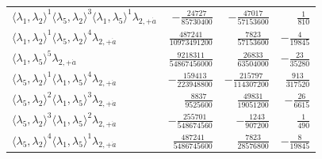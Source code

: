 \begin{longtable}{@{}lrrr@{}}
$\langle\lambda_1,\lambda_2\rangle^{1}\langle\lambda_5,\lambda_2\rangle^{3}\langle\lambda_1,\lambda_5\rangle^{1}\lambda_{2,+\dot a}$ & $-\frac{24727}{85730400}$ & $-\frac{47017}{57153600}$ & $\frac{1}{810}$ \\
$\langle\lambda_1,\lambda_2\rangle^{1}\langle\lambda_5,\lambda_2\rangle^{4}\lambda_{2,+\dot a}$ & $\frac{487241}{10973491200}$ & $\frac{7823}{57153600}$ & $-\frac{4}{19845}$ \\
$\langle\lambda_1,\lambda_5\rangle^{5}\lambda_{2,+\dot a}$ & $\frac{9218311}{54867456000}$ & $\frac{26833}{63504000}$ & $-\frac{23}{35280}$ \\
$\langle\lambda_5,\lambda_2\rangle^{1}\langle\lambda_1,\lambda_5\rangle^{4}\lambda_{2,+\dot a}$ & $-\frac{159413}{223948800}$ & $-\frac{215797}{114307200}$ & $\frac{913}{317520}$ \\
$\langle\lambda_5,\lambda_2\rangle^{2}\langle\lambda_1,\lambda_5\rangle^{3}\lambda_{2,+\dot a}$ & $\frac{8837}{9525600}$ & $\frac{49831}{19051200}$ & $-\frac{26}{6615}$ \\
$\langle\lambda_5,\lambda_2\rangle^{3}\langle\lambda_1,\lambda_5\rangle^{2}\lambda_{2,+\dot a}$ & $-\frac{255701}{548674560}$ & $-\frac{1243}{907200}$ & $\frac{1}{490}$ \\
$\langle\lambda_5,\lambda_2\rangle^{4}\langle\lambda_1,\lambda_5\rangle^{1}\lambda_{2,+\dot a}$ & $\frac{487241}{5486745600}$ & $\frac{7823}{28576800}$ & $-\frac{8}{19845}$ \\
\end{longtable}
